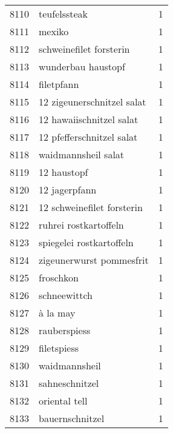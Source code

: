 \begin{tabular}{llr}
8110 &                                       teufelssteak &      1 \\
8111 &                                             mexiko &      1 \\
8112 &                            schweinefilet forsterin &      1 \\
8113 &                                 wunderbau haustopf &      1 \\
8114 &                                         filetpfann &      1 \\
8115 &                         12 zigeunerschnitzel salat &      1 \\
8116 &                           12 hawaiischnitzel salat &      1 \\
8117 &                          12 pfefferschnitzel salat &      1 \\
8118 &                                waidmannsheil salat &      1 \\
8119 &                                        12 haustopf &      1 \\
8120 &                                      12 jagerpfann &      1 \\
8121 &                         12 schweinefilet forsterin &      1 \\
8122 &                              ruhrei rostkartoffeln &      1 \\
8123 &                           spiegelei rostkartoffeln &      1 \\
8124 &                           zigeunerwurst pommesfrit &      1 \\
8125 &                                          froschkon &      1 \\
8126 &                                       schneewittch &      1 \\
8127 &                                           à la may &      1 \\
8128 &                                       rauberspiess &      1 \\
8129 &                                        filetspiess &      1 \\
8130 &                                      waidmannsheil &      1 \\
8131 &                                     sahneschnitzel &      1 \\
8132 &                                      oriental tell &      1 \\
8133 &                                    bauernschnitzel &      1 \\

\end{tabular}
